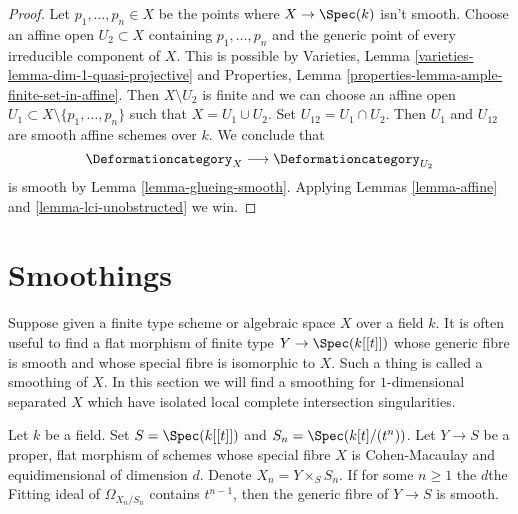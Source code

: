 \begin{proof}
Let $p_1, \ldots, p_n \in X$ be the points where $X \to \Spec(k)$
isn't smooth. Choose an affine open $U_2 \subset X$ containing
$p_1, \ldots, p_n$ and the generic point of every irreducible
component of $X$. This is possible by
Varieties, Lemma \ref{varieties-lemma-dim-1-quasi-projective}
and Properties, Lemma \ref{properties-lemma-ample-finite-set-in-affine}.
Then $X \setminus U_2$ is finite and we can choose an affine open
$U_1 \subset X \setminus \{p_1, \ldots, p_n\}$ such that
$X = U_1 \cup U_2$. Set $U_{12} = U_1 \cap U_2$.
Then $U_1$ and $U_{12}$ are smooth affine schemes over $k$.
We conclude that
$$
\Deformationcategory_X \longrightarrow \Deformationcategory_{U_2}
$$
is smooth by Lemma \ref{lemma-glueing-smooth}.
Applying Lemmas \ref{lemma-affine} and \ref{lemma-lci-unobstructed} we win.
\end{proof}




\section{Smoothings}
\label{section-smoothing}

\noindent
Suppose given a finite type scheme or algebraic space $X$ over a field $k$.
It is often useful to find a flat morphism of finite type $Y \to \Spec(k[[t]])$
whose generic fibre is smooth and whose special fibre is isomorphic to $X$.
Such a thing is called a smoothing of $X$. In this section we will find
a smoothing for $1$-dimensional separated $X$ which have isolated
local complete intersection singularities.

\begin{lemma}
\label{lemma-criterion-smoothing}
Let $k$ be a field. Set $S = \Spec(k[[t]])$ and
$S_n = \Spec(k[t]/(t^n))$. Let $Y \to S$ be a proper, flat morphism
of schemes whose special fibre $X$ is Cohen-Macaulay and
equidimensional of dimension $d$. Denote $X_n = Y \times_S S_n$.
If for some $n \geq 1$ the $d$the Fitting ideal of $\Omega_{X_n/S_n}$
contains $t^{n - 1}$, then the generic fibre of $Y \to S$ is smooth.
\end{lemma}

